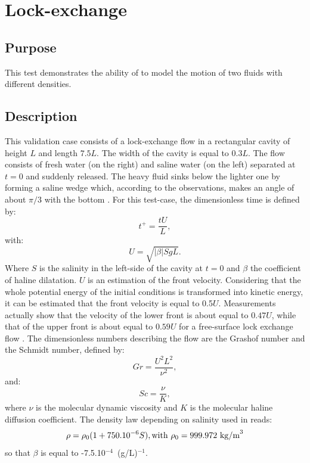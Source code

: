 \chapter{Lock-exchange}

\section{Purpose}

This test demonstrates the ability of  to model the motion
of two fluids with different densities.

\section{Description}

This validation case consists of a lock-exchange flow in a rectangular cavity of
height $L$ and length $7.5L$. The width of the cavity is equal to $0.3L$.
The flow consists of fresh water (on the right) and saline water (on the left)
separated at $t=0$ and suddenly released.
The heavy fluid sinks below the lighter one by forming a saline wedge which,
according to the observations, makes an angle of about $\pi/3$ with the bottom
\cite{Benjamin1968}.
For this test-case, the dimensionless time is defined by:
\begin{equation}
t^+= \frac{t U}{L},
\end{equation}
with:
\begin{equation}
U = \sqrt{|\beta| S gL}.
\end{equation}
Where $S$ is the salinity in the left-side of the cavity at $t=0$ and
$\beta$ the coefficient of haline dilatation.
$U$ is an estimation of the front velocity. Considering that the whole potential
energy of the initial conditions is transformed into kinetic energy, it can be
estimated that the front velocity is equal to 0.5$U$.
Measurements actually show that the velocity of the lower front is about equal
to $0.47U$,
while that of the upper front is about equal to $0.59U$ for a free-surface lock
exchange flow \cite{Barr1967}.
The dimensionless numbers describing the flow are the Grashof number
and the Schmidt number, defined by:
\begin{equation}\label{eq:Grashof}
  Gr = \dfrac{U^2 L^2}{\nu^2},
\end{equation}
and:
\begin{equation}\label{eq:Schmidt}
  Sc =  \dfrac{\nu}{K},
\end{equation}
where $\nu$ is the molecular dynamic viscosity and $K$ is the molecular
haline diffusion coefficient.
The density law depending on salinity used in  reads:
\begin{equation}
\rho = \rho_{0} (1 + 750.10^{-6} S ),
\rm{with }~ \rho_{0} = 999.972~\rm{kg/m}^3
\end{equation}
so that $\beta$ is equal to -7.5.10$^{-4}$~(g/L)$^{-1}$.

